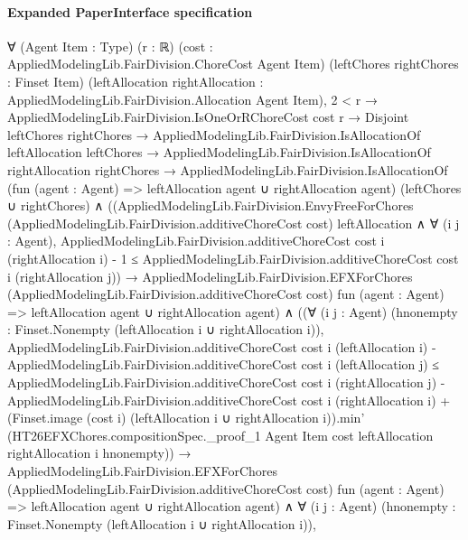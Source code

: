 \documentclass[10pt]{article}
\begin{document}
\paragraph{Expanded PaperInterface specification}
\begin{ReviewVerbatim}
∀ (Agent Item : Type) (r : ℝ) (cost : AppliedModelingLib.FairDivision.ChoreCost Agent Item)
  (leftChores rightChores : Finset Item)
  (leftAllocation rightAllocation : AppliedModelingLib.FairDivision.Allocation Agent Item),
  2 < r →
    AppliedModelingLib.FairDivision.IsOneOrRChoreCost cost r →
      Disjoint leftChores rightChores →
        AppliedModelingLib.FairDivision.IsAllocationOf leftAllocation leftChores →
          AppliedModelingLib.FairDivision.IsAllocationOf rightAllocation rightChores →
            AppliedModelingLib.FairDivision.IsAllocationOf
                (fun (agent : Agent) => leftAllocation agent ∪ rightAllocation agent) (leftChores ∪ rightChores) ∧
              ((AppliedModelingLib.FairDivision.EnvyFreeForChores
                      (AppliedModelingLib.FairDivision.additiveChoreCost cost) leftAllocation ∧
                    ∀ (i j : Agent),
                      AppliedModelingLib.FairDivision.additiveChoreCost cost i (rightAllocation i) - 1 ≤
                        AppliedModelingLib.FairDivision.additiveChoreCost cost i (rightAllocation j)) →
                  AppliedModelingLib.FairDivision.EFXForChores (AppliedModelingLib.FairDivision.additiveChoreCost cost)
                    fun (agent : Agent) => leftAllocation agent ∪ rightAllocation agent) ∧
                ((∀ (i j : Agent) (hnonempty : Finset.Nonempty (leftAllocation i ∪ rightAllocation i)),
                      AppliedModelingLib.FairDivision.additiveChoreCost cost i (leftAllocation i) -
                          AppliedModelingLib.FairDivision.additiveChoreCost cost i (leftAllocation j) ≤
                        AppliedModelingLib.FairDivision.additiveChoreCost cost i (rightAllocation j) -
                            AppliedModelingLib.FairDivision.additiveChoreCost cost i (rightAllocation i) +
                          (Finset.image (cost i) (leftAllocation i ∪ rightAllocation i)).min'
                            (HT26EFXChores.compositionSpec._proof_1 Agent Item cost leftAllocation rightAllocation i
                              hnonempty)) →
                    AppliedModelingLib.FairDivision.EFXForChores
                      (AppliedModelingLib.FairDivision.additiveChoreCost cost) fun (agent : Agent) =>
                      leftAllocation agent ∪ rightAllocation agent) ∧
                  ∀ (i j : Agent) (hnonempty : Finset.Nonempty (leftAllocation i ∪ rightAllocation i)),

\end{ReviewVerbatim}
\end{document}
